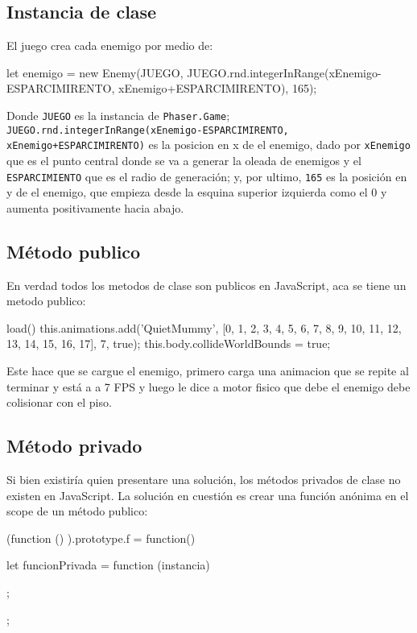 \documentclass{article}
\newcommand{\insertverbbox}{{\addvbuffer[6pt 3pt]{\theverbbox}\par}}
\begin{document}
    \subsection*{Instancia de clase}
    El juego crea cada enemigo por medio de:
    
    \begin{verbbox}
		let enemigo = new Enemy(JUEGO, 
		        JUEGO.rnd.integerInRange(xEnemigo-ESPARCIMIRENTO, xEnemigo+ESPARCIMIRENTO),
		        165);       
    \end{verbbox}
    \insertverbbox
	
	Donde \verb|JUEGO| es la instancia de \verb|Phaser.Game|; \verb|JUEGO.rnd.integerInRange(xEnemigo-ESPARCIMIRENTO, xEnemigo+ESPARCIMIRENTO)| es la posicion en x de el enemigo, dado por \verb|xEnemigo| que es el punto central donde se va a generar la oleada de enemigos y el \verb|ESPARCIMIENTO| que es el radio de generación; y, por ultimo, \verb|165| es la posición en y de el enemigo, que empieza desde la esquina superior izquierda como el 0 y aumenta positivamente hacia abajo.
	
    \subsection*{Método publico}
	En verdad todos los metodos de clase son publicos en JavaScript, aca se tiene un metodo publico:
	
	\begin{verbbox}
		load() {
		    this.animations.add('QuietMummy', [0, 1, 2, 3, 4, 5, 6, 7, 8, 9, 10, 11, 12, 13, 14, 15, 16, 17], 7, true);
		    this.body.collideWorldBounds = true;
		}
	\end{verbbox}
	\insertverbbox
     
    Este hace que se cargue el enemigo, primero carga una animacion que se repite al terminar y está a a 7 FPS y luego le dice a motor fisico que debe el enemigo debe colisionar con el piso.
    
   	\subsection*{Método privado}
   	Si bien existiría quien presentare una solución, los métodos privados de clase no existen en JavaScript. La solución en cuestión es crear una función anónima en el  scope de un método publico:
   	
   	\begin{verbbox}
		(function () {}).prototype.f = function() {
		    let funcionPrivada = function (instancia) {
		    	
		    };
		};
   	\end{verbbox}
   	\insertverbbox
   	
\end{document}
